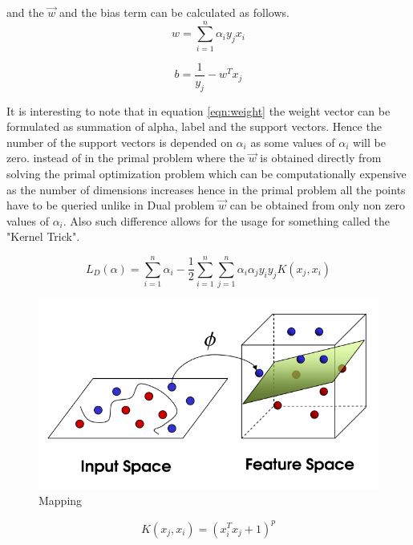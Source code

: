 \documentclass[10pt,twocolumn,letterpaper]{article}
\begin{document}
and the $\overrightarrow{w}$ and the bias term can be calculated as follows. 
\begin{equation}
w=\sum ^{n}_{i=1}\alpha _{i}y_{j}x_{i}
\label{eqn:weight}
\end{equation}

\begin{equation}
b =\dfrac{1}{y_{j}}-w^{T}x_{j}
\end{equation}
 
It is interesting to note that in equation \ref{eqn:weight} the weight vector can be formulated as summation of alpha, label and the support vectors. Hence the number of the support vectors is depended on $\alpha _{i}$ as some values of $\alpha _{i}$ will be zero.
instead of in the primal problem where the $\overrightarrow{w}$ is obtained directly from solving the primal optimization problem which can be computationally expensive as the number of dimensions increases hence in the primal problem all the points have to be queried unlike in Dual problem $\overrightarrow{w}$ can be obtained from only non zero values of $\alpha _{i}$. Also such difference allows for the usage for something called the "Kernel Trick".
 
\begin{equation}
L_{D}\left( \alpha \right) =\sum ^{n}_{i=1}\alpha _{i}-\dfrac{1}{2}\sum ^{n}_{i=1}\sum ^{n}_{j=1}\alpha _{i}\alpha _{j}y_{i}y_{j}K\left( x_{j},x_{i}\right) 
\label{eqn:lk}
\end{equation} 


\begin{figure}[h!]
  \includegraphics[width=\linewidth]{kernel.png}
  \caption{Mapping}
  \label{fig:kernel}
\end{figure}


\begin{equation}
K\left( x_{j},x_{i}\right) =\left( x_{i}^{T}x_{j}+1\right) ^{p}
\label{eq:polyk}
\end{equation}
\end{document}
